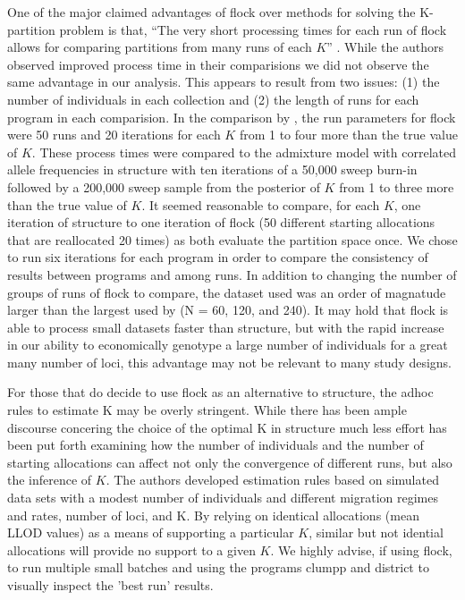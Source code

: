 One of the major claimed advantages of {\sc flock} over methods for solving the 
K-partition problem is that, ``The very short processing times for each run of {\sc flock} allows for
 comparing partitions from many runs of each $K$'' \citep[][p.~735]{Duc&Tur2012}.
While the authors observed improved process time in their 
comparisions we did not observe the same advantage in our analysis. This appears to result from two issues:
(1) the number of individuals in each collection and (2) the length of runs for each program in each comparision. 
In the comparison by \citep{Duc&Tur2012}, the 
run parameters for {\sc flock} were 50 runs and 20 iterations for each $K$ from 1 to four more than 
the true value of $K$. 
These process times were compared to the admixture model with correlated allele 
frequencies in {\sc structure} with ten iterations of a 50,000 sweep burn-in followed 
by a 200,000 sweep sample from the posterior of $K$ from 1 to three more than the true 
value of $K$. 
It seemed reasonable to compare, for each $K$, one iteration of {\sc structure} 
to one iteration of {\sc flock} (50 different starting allocations that are reallocated 20 times) 
as both evaluate the partition space once. We chose to run six iterations for each program
in order to compare the consistency of results between programs and among runs.
In addition to changing the number of groups of runs of {\sc flock} to compare,
the dataset used was an order of magnatude
larger than the largest used by \citep{Duc&Tur2012} (N = 60, 120, and 240). It may hold that {\sc flock}
is able to process small datasets faster than {\sc structure}, but with the rapid increase in our ability to economically
genotype a large number of individuals for a great many number of loci, this advantage may not be relevant to many 
study designs.

For those that do decide to use {\sc flock} as an alternative to {\sc structure}, the adhoc rules 
to estimate K may be overly stringent. While there has been ample 
discourse concering the choice of the optimal K in {\sc structure} \citep{Evannoetal2005, 
Pritchardetal2000, Wap&Gag2006} much less effort has been put forth examining how the number of individuals
and the number of starting allocations can affect not only the convergence of different runs, but also the 
inference of $K$. The authors developed estimation rules based on simulated data 
sets with a modest number of individuals and different migration regimes and rates, number of loci, and K. 
By relying on identical allocations (mean LLOD values) as a means of supporting 
a particular $K$,  similar but not idential 
allocations will provide no support to a given $K$. We highly advise, if using {\sc flock}, to
run multiple small batches and using the programs {\sc clumpp} \citep{Jak&Ros2007} and
{\sc district} \citep{Rosenberg2004} to visually inspect the 'best run' results.  

